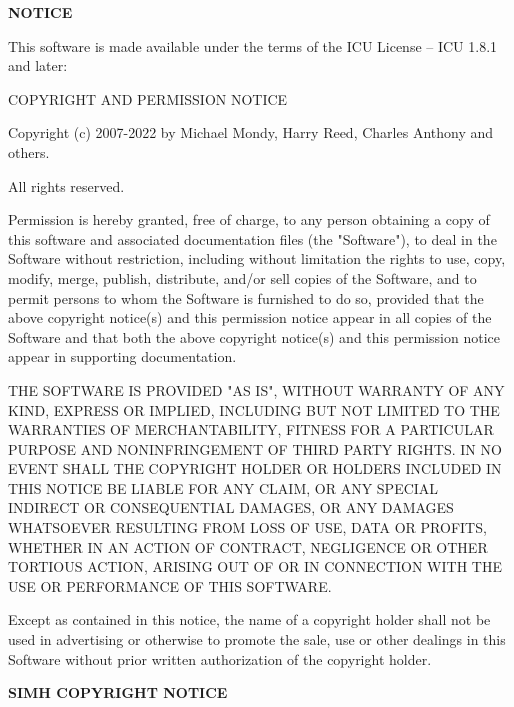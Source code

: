 \begin{center}
	\Large\bfseries NOTICE
\end{center}

\begin{center}
This software is made available under the terms of the ICU License -- ICU 1.8.1 and later:

COPYRIGHT AND PERMISSION NOTICE

Copyright (c) 2007-2022 by Michael Mondy, Harry Reed, Charles Anthony and
others.

All rights reserved.
\end{center}

Permission is hereby granted, free of charge, to any person obtaining a copy of
this software and associated documentation files (the "Software"), to deal in
the Software without restriction, including without limitation the rights to
use, copy, modify, merge, publish, distribute, and/or sell copies of the
Software, and to permit persons to whom the Software is furnished to do so,
provided that the above copyright notice(s) and this permission notice appear
in all copies of the Software and that both the above copyright notice(s) and
this permission notice appear in supporting documentation.

THE SOFTWARE IS PROVIDED "AS IS", WITHOUT WARRANTY OF ANY KIND, EXPRESS OR
IMPLIED, INCLUDING BUT NOT LIMITED TO THE WARRANTIES OF MERCHANTABILITY,
FITNESS FOR A PARTICULAR PURPOSE AND NONINFRINGEMENT OF THIRD PARTY RIGHTS. IN
NO EVENT SHALL THE COPYRIGHT HOLDER OR HOLDERS INCLUDED IN THIS NOTICE BE
LIABLE FOR ANY CLAIM, OR ANY SPECIAL INDIRECT OR CONSEQUENTIAL DAMAGES, OR ANY
DAMAGES WHATSOEVER RESULTING FROM LOSS OF USE, DATA OR PROFITS, WHETHER IN AN
ACTION OF CONTRACT, NEGLIGENCE OR OTHER TORTIOUS ACTION, ARISING OUT OF OR IN
CONNECTION WITH THE USE OR PERFORMANCE OF THIS SOFTWARE.

Except as contained in this notice, the name of a copyright holder shall not be
used in advertising or otherwise to promote the sale, use or other dealings in
this Software without prior written authorization of the copyright holder.

\newpage

\textbf{SIMH COPYRIGHT NOTICE}

